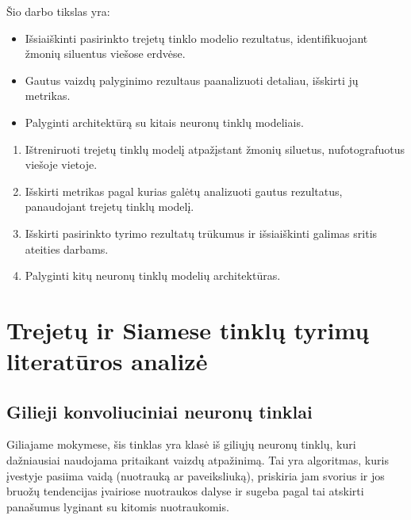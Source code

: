 \documentclass{VUMIFPSkursinis}
\begin{document}
\pagebreak
{}
Šio darbo tikslas yra:
\begin{itemize}
\item{Išsiaiškinti pasirinkto trejetų tinklo modelio rezultatus, identifikuojant žmonių siluentus viešose erdvėse.}
\item{Gautus vaizdų palyginimo rezultaus paanalizuoti detaliau, išskirti jų metrikas.}
\item{Palyginti architektūrą su kitais neuronų tinklų modeliais.}
\end{itemize}
 
\thispagestyle{empty}
\begin{enumerate}
\item{Ištreniruoti trejetų tinklų modelį atpažįstant žmonių siluetus, nufotografuotus viešoje vietoje.}
\item{ Išskirti metrikas pagal kurias galėtų analizuoti gautus rezultatus, panaudojant trejetų tinklų modelį.}
\item{Išskirti pasirinkto tyrimo rezultatų trūkumus ir išsiaiškinti galimas sritis ateities darbams.}
\item{Palyginti kitų neuronų tinklų modelių architektūras.}
\end{enumerate}

\pagebreak
\section{Trejetų ir Siamese tinklų tyrimų literatūros analizė}

\subsection{Gilieji konvoliuciniai neuronų tinklai}
Giliajame mokymese, šis tinklas yra klasė iš giliųjų neuronų tinklų, kuri dažniausiai naudojama pritaikant vaizdų atpažinimą. Tai yra algoritmas, kuris įvestyje pasiima vaidą (nuotrauką ar paveiksliuką), priskiria jam svorius ir jos bruožų tendencijas įvairiose nuotraukos dalyse ir sugeba pagal tai atskirti panašumus lyginant su kitomis nuotraukomis.
\end{document}
